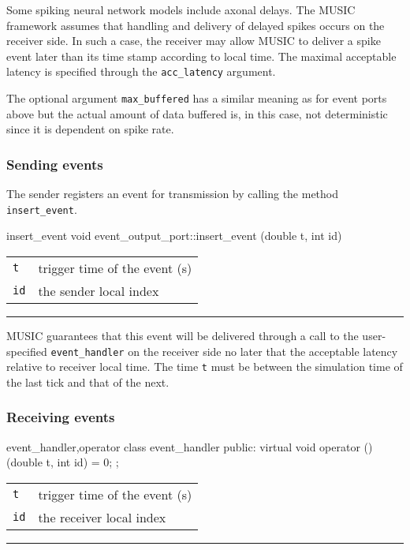 \documentclass[a4paper]{report}
\makeatletter
\newenvironment{parameters}%
{\begin{tabular}{@{\hspace{2em}}lp{0.6\textwidth}}}%
{\end{tabular}\par\vspace{1mm}\par\hrule\par\vspace{5mm}}
\makeatother
\begin{document}
Some spiking neural network models include axonal delays.  The MUSIC
framework assumes that handling and delivery of delayed spikes occurs
on the receiver side.  In such a case, the receiver may allow MUSIC to
deliver a spike event later than its time stamp according to local
time.  The maximal acceptable latency is specified through the
\lstinline|acc_latency| argument.

The optional argument \lstinline|max_buffered|
has a similar meaning as for event ports above but the actual amount
of data buffered is, in this case, not deterministic since it is
dependent on spike rate.

\subsubsection{Sending events}

The sender registers an event for transmission by calling the method
\lstinline|insert_event|.

\begin{head}{insert_event}
  void event_output_port::insert_event (double t, int id)
\end{head}
\begin{parameters}
  \lstinline|t| & trigger time of the event (s) \\
  \lstinline|id| & the sender local index \\
\end{parameters}

MUSIC guarantees that this event will be delivered through a call to
the user-specified \lstinline|event_handler| on the receiver side no
later that the acceptable latency relative to receiver local time.
The time \lstinline|t| must be between the simulation time of the last
tick and that of the next.


\subsubsection{Receiving events}

\begin{head}{event_handler,operator}
  class event_handler {
  public:
    virtual void operator () (double t, int id) = 0;
  };
\end{head}
\begin{parameters}
  \lstinline|t| & trigger time of the event (s) \\
  \lstinline|id| & the receiver local index \\
\end{parameters}
\end{document}
